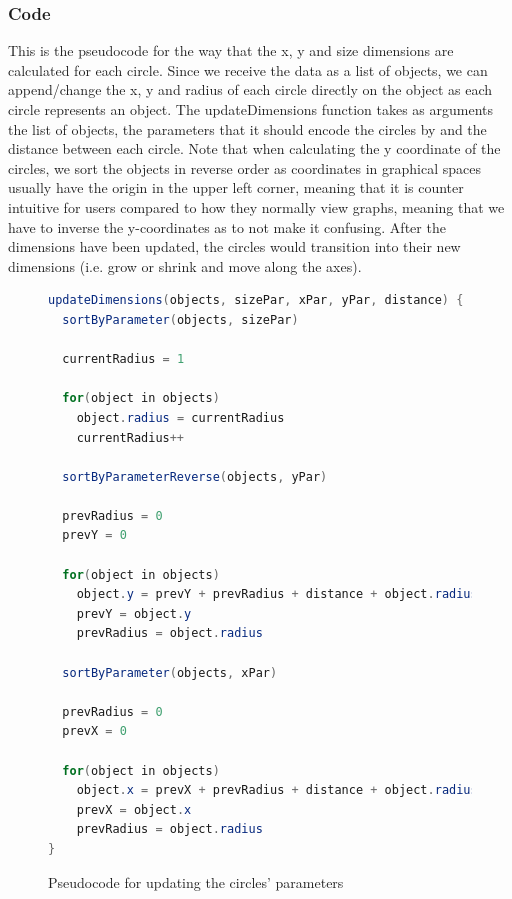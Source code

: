 \documentclass[Report.tex]{subfiles}
\begin{document}
\subsubsection{Code}
This is the pseudocode for the way that the x, y and size dimensions are calculated for each circle.
Since we receive the data as a list of objects, we can append/change the x, y and radius of each circle directly on the object as each circle represents an object. The updateDimensions function takes as arguments the list of objects, the parameters that it should encode the circles by and the distance between each circle. Note that when calculating the y coordinate of the circles, we sort the objects in reverse order as coordinates in graphical spaces usually have the origin in the upper left corner, meaning that it is counter intuitive for users compared to how they normally view graphs, meaning that we have to inverse the y-coordinates as to not make it confusing. After the dimensions have been updated, the circles would transition into their new dimensions (i.e. grow or shrink and move along the axes).
\begin{figure}
\begin{lstlisting}[language=java]
updateDimensions(objects, sizePar, xPar, yPar, distance) {
  sortByParameter(objects, sizePar)

  currentRadius = 1

  for(object in objects)
    object.radius = currentRadius
    currentRadius++

  sortByParameterReverse(objects, yPar)

  prevRadius = 0
  prevY = 0

  for(object in objects)
    object.y = prevY + prevRadius + distance + object.radius
    prevY = object.y
    prevRadius = object.radius

  sortByParameter(objects, xPar)

  prevRadius = 0
  prevX = 0

  for(object in objects)
    object.x = prevX + prevRadius + distance + object.radius
    prevX = object.x
    prevRadius = object.radius
}
\end{lstlisting}
\caption{Pseudocode for updating the circles' parameters}
\end{figure}
\end{document}
